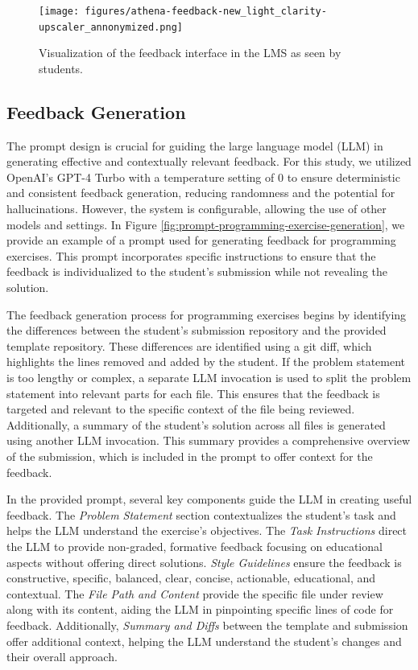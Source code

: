 \documentclass[manuscript,screen,review, anonymous]{acmart}
\begin{document}
\begin{figure}[htbp]
  \centering
  \texttt{[image: figures/athena-feedback-new\_light\_clarity-upscaler\_annonymized.png]}
  \caption{Visualization of the feedback interface in the LMS as seen by students.}
  \label{fig:Artemis-feedback-visualization}
\end{figure}


\subsection{Feedback Generation}

The prompt design is crucial for guiding the large language model (LLM) in generating effective and contextually relevant feedback. For this study, we utilized OpenAI's GPT-4 Turbo with a temperature setting of 0 to ensure deterministic and consistent feedback generation, reducing randomness and the potential for hallucinations. However, the system is configurable, allowing the use of other models and settings. In Figure \ref{fig:prompt-programming-exercise-generation}, we provide an example of a prompt used for generating feedback for programming exercises. 
This prompt incorporates specific instructions to ensure that the feedback is individualized to the student's submission while not revealing the solution.

The feedback generation process for programming exercises begins by identifying the differences between the student's submission repository and the provided template repository. 
These differences are identified using a git diff, which highlights the lines removed and added by the student. 
If the problem statement is too lengthy or complex, a separate LLM invocation is used to split the problem statement into relevant parts for each file. 
This ensures that the feedback is targeted and relevant to the specific context of the file being reviewed. 
Additionally, a summary of the student's solution across all files is generated using another LLM invocation. 
This summary provides a comprehensive overview of the submission, which is included in the prompt to offer context for the feedback.

In the provided prompt, several key components guide the LLM in creating useful feedback. The \textit{Problem Statement} section contextualizes the student's task and helps the LLM understand the exercise's objectives.
The \textit{Task Instructions} direct the LLM to provide non-graded, formative feedback focusing on educational aspects without offering direct solutions.
\textit{Style Guidelines} ensure the feedback is constructive, specific, balanced, clear, concise, actionable, educational, and contextual.
The \textit{File Path and Content} provide the specific file under review along with its content, aiding the LLM in pinpointing specific lines of code for feedback.
Additionally, \textit{Summary and Diffs} between the template and submission offer additional context, helping the LLM understand the student's changes and their overall approach.
\end{document}
